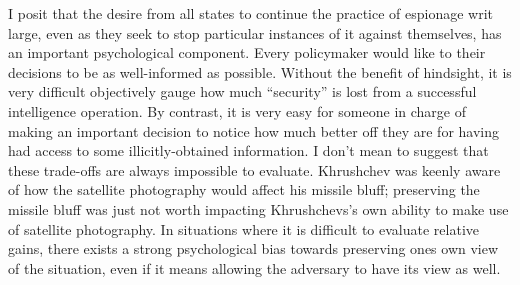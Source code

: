 \documentclass[11pt]{memoir}
\begin{document}
\begin{refsegment}
I posit that the desire from all states to continue the practice of espionage writ large, even as they seek to stop particular instances of it against themselves, has an important psychological component. Every policymaker would like to their decisions to be as well-informed as possible. Without the benefit of hindsight, it is very difficult objectively gauge how much ``security'' is lost from a successful intelligence operation. By contrast, it is very easy for someone in charge of making an important decision to notice how much better off they are for having had access to some illicitly-obtained information. I don't mean to suggest that these trade-offs are always impossible to evaluate. Khrushchev was keenly aware of how the satellite photography would affect his missile bluff; preserving the missile bluff was just not worth impacting Khrushchevs's own ability to make use of satellite photography. In situations where it is difficult to evaluate relative gains, there exists a strong psychological bias towards preserving ones own view of the situation, even if it means allowing the adversary to have its view as well.




\newpage
\printbibliography[heading=subbibliography]

\end{refsegment}
\end{document}
